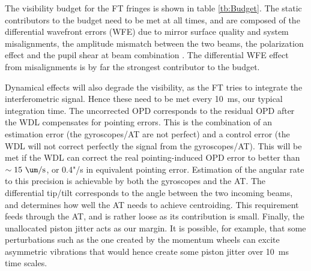 The visibility budget for the FT fringes is shown in table \ref{tb:Budget}. The static contributors to the budget need to be met at all times, and are composed of the differential wavefront errors (WFE) due to mirror surface quality and system misalignments, the amplitude mismatch between the two beams, the polarization effect and the pupil shear at beam combination \citep{Lawson:2000vf}. The differential WFE effect from misalignments is by far the strongest contributor to the budget. 

Dynamical effects will also degrade the visibility, as the FT tries to integrate the interferometric signal. Hence these need to be met every 10~ms, our typical integration time. The uncorrected OPD corresponds to the residual OPD after the WDL compensates for pointing errors. This is the combination of an estimation error (the gyroscopes/AT are not perfect) and a control error (the WDL will not correct perfectly the signal from the gyroscopes/AT). This will be met if the WDL can correct the real pointing-induced OPD error to better than $\sim 15~\um/\textrm{s}$, or 0.4"/s in equivalent pointing error. Estimation of the angular rate to this precision is achievable by both the gyroscopes and the AT. The differential tip/tilt corresponds to the angle between the two incoming beams, and determines how well the AT needs to achieve centroiding. This requirement feeds through the AT, and is rather loose as its contribution is small. Finally, the unallocated piston jitter acts as our margin. It is possible, for example, that some perturbations such as the one created by the momentum wheels can excite asymmetric vibrations that would hence create some piston jitter over 10~ms time scales.


